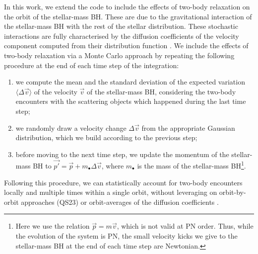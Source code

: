 \documentclass[desactivate]{aa}
\newcommand{\lb}[1]{\textcolor{orange}{#1}}
\newcommand{\dm}[1]{\textcolor{teal}{DM: #1}}
\newcommand{\as}[1]{\textcolor{red}{AS: #1}}
\begin{document}
        In this work, we extend the code to include the effects of two-body relaxation on the orbit of the stellar-mass BH. These are due to the gravitational interaction of the stellar-mass BH with the rest of the stellar distribution. These stochastic interactions are fully characterised by the diffusion coefficients of the velocity component computed from their distribution function \citep{shapiroStarClustersContaining1978,1978ApJ...226.1087C,2013degn.book.....M}. We include the effects of two-body relaxation via a Monte Carlo approach by repeating the following procedure at the end of each time step of the integration:
        \begin{enumerate}
            \item we compute the mean and the standard deviation of the expected variation $\langle \Delta \vec{v}\rangle$ of the velocity $\vec{v}$ of the stellar-mass BH, considering the two-body encounters with the scattering objects which happened during the last time step;
            \item we randomly draw a velocity change $\Delta \vec{v}$ from the appropriate Gaussian distribution, which we build according to the previous step;
            \item before moving to the next time step, we update the momentum of the stellar-mass BH to $\vec{p'} = \vec{p} + m_\bullet \Delta \vec{v}$, where $m_\bullet$ is the mass of the stellar-mass BH\footnote{Here we use the relation $\vec{p} = m \vec{v}$, which is not valid at PN order. Thus, while the evolution of the system is PN, the small velocity kicks we give to the stellar-mass BH at the end of each time step are Newtonian.
            }.
        \end{enumerate}

        Following this procedure, we can statistically account for two-body encounters locally and multiple times within a single orbit, without leveraging on orbit-by-orbit approaches (QS23) or orbit-averages of the diffusion coefficients \citep{zhangMonteCarloStellarDynamics2023a}.
\end{document}
